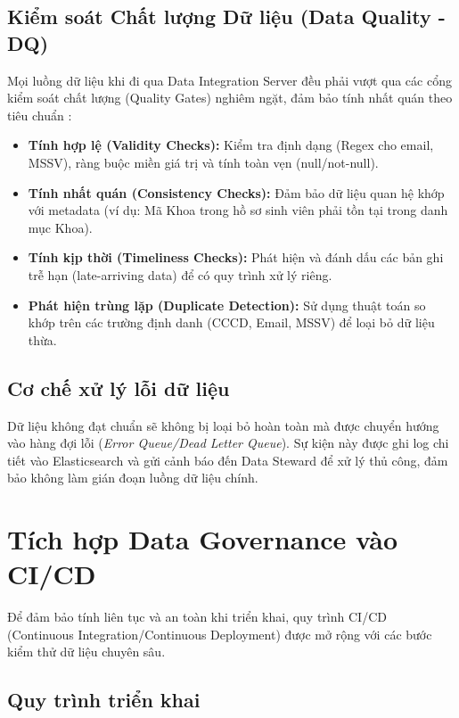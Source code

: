 \subsection{Kiểm soát Chất lượng Dữ liệu (Data Quality - DQ)}

Mọi luồng dữ liệu khi đi qua Data Integration Server đều phải vượt qua các cổng kiểm soát chất lượng (Quality Gates) nghiêm ngặt, đảm bảo tính nhất quán theo tiêu chuẩn \cite{gartner:data_consistency}:

\begin{itemize}
    \item \textbf{Tính hợp lệ (Validity Checks):} Kiểm tra định dạng (Regex cho email, MSSV), ràng buộc miền giá trị và tính toàn vẹn (null/not-null).
    \item \textbf{Tính nhất quán (Consistency Checks):} Đảm bảo dữ liệu quan hệ khớp với metadata (ví dụ: Mã Khoa trong hồ sơ sinh viên phải tồn tại trong danh mục Khoa).
    \item \textbf{Tính kịp thời (Timeliness Checks):} Phát hiện và đánh dấu các bản ghi trễ hạn (late-arriving data) để có quy trình xử lý riêng.
    \item \textbf{Phát hiện trùng lặp (Duplicate Detection):} Sử dụng thuật toán so khớp trên các trường định danh (CCCD, Email, MSSV) để loại bỏ dữ liệu thừa.
\end{itemize}

\subsection{Cơ chế xử lý lỗi dữ liệu}

Dữ liệu không đạt chuẩn sẽ không bị loại bỏ hoàn toàn mà được chuyển hướng vào hàng đợi lỗi (\textit{Error Queue/Dead Letter Queue}). Sự kiện này được ghi log chi tiết vào Elasticsearch và gửi cảnh báo đến Data Steward để xử lý thủ công, đảm bảo không làm gián đoạn luồng dữ liệu chính.

\section{Tích hợp Data Governance vào CI/CD}

Để đảm bảo tính liên tục và an toàn khi triển khai, quy trình CI/CD (Continuous Integration/Continuous Deployment) được mở rộng với các bước kiểm thử dữ liệu chuyên sâu.

\subsection{Quy trình triển khai}


